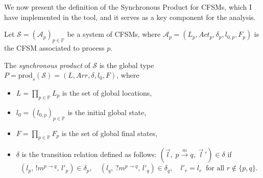 We now present the
definition of the Synchronous Product for CFSMs, which I have implemented in the
tool, and it serves as a key component for the analysis.

\bigskip

\begin{definition}\label{def:syncprod}
Let $\mathcal{S} = (\mathcal{A}_p)_{p \in \mathbb{P}}$ be a system of CFSMs, where 
$\mathcal{A}_p = (L_p, \mathit{Act}_p, \delta_p, l_{0,p}, F_p)$ is the CFSM associated 
to process $p$.  

The \emph{synchronous product} of $\mathcal{S}$ is the global type 
$P = \mathrm{prod}_s(\mathcal{S}) = (L, \mathit{Arr}, \delta, l_0, F)$,
where
\begin{itemize}
    \item $L = \prod_{p \in \mathbb{P}} L_p$ is the set of global locations,
    \item $l_0 = (l_{0,p})_{p \in \mathbb{P}}$ is the initial global state,
    \item $F = \prod_{p \in \mathbb{P}} F_p$ is the set of global final states,
    \item $\delta$ is the transition relation defined as follows:  
    $(\vec{l}, \; p \xrightarrow{m} q, \; \vec{l}\,') \in \delta$ if
    \[
    (l_p,\, !m^{p \to q},\, l'_p) \in \delta_p, \quad 
    (l_q,\, ?m^{p \to q},\, l'_q) \in \delta_q, \quad 
    l'_r = l_r \;\; \text{for all } r \notin \{p,q\}.
    \]
\end{itemize}
\end{definition}

\bigskip


